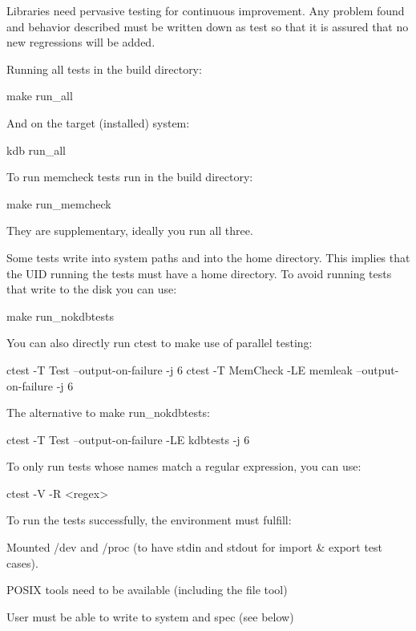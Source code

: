 Libraries need pervasive testing for continuous improvement. Any problem found and behavior described must be written down as test so that it is assured that no new regressions will be added.

Running all tests in the build directory\+:


\begin{DoxyCode}
make run\_all
\end{DoxyCode}


And on the target (installed) system\+:


\begin{DoxyCode}
kdb run\_all
\end{DoxyCode}


To run {\ttfamily memcheck} tests run in the build directory\+:


\begin{DoxyCode}
make run\_memcheck
\end{DoxyCode}


They are supplementary, ideally you run all three.

Some tests write into system paths and into the home directory. This implies that the U\+ID running the tests must have a home directory. To avoid running tests that write to the disk you can use\+:


\begin{DoxyCode}
make run\_nokdbtests
\end{DoxyCode}


You can also directly run ctest to make use of parallel testing\+:


\begin{DoxyCode}
ctest -T Test --output-on-failure -j 6
ctest -T MemCheck -LE memleak --output-on-failure -j 6
\end{DoxyCode}


The alternative to {\ttfamily make run\+\_\+nokdbtests}\+:


\begin{DoxyCode}
ctest -T Test --output-on-failure -LE kdbtests -j 6
\end{DoxyCode}


To only run tests whose names match a regular expression, you can use\+:


\begin{DoxyCode}
ctest -V -R <regex>
\end{DoxyCode}


To run the tests successfully, the environment must fulfill\+:


\begin{DoxyItemize}
\item Mounted /dev and /proc (to have stdin and stdout for import \& export test cases).
\item P\+O\+S\+IX tools need to be available (including the {\ttfamily file} tool)
\item User must be able to write to system and spec (see below)
\end{DoxyItemize}

